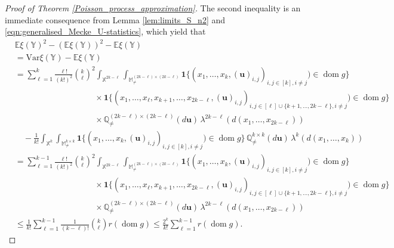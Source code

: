 \documentclass{article}
\theoremstyle{definition}
\numberwithin{equation}{section}
\theoremstyle{remark}
\newcommand{\E}{\mathbb{E}}
\newcommand{\Var}{\mathrm{Var}}
\begin{document}
\begin{proof}[Proof of Theorem \ref{Poisson_process_approximation}]
The second inequality is an immediate consequence from Lemma \ref{lem:limits_S_n2} and \eqref{eqn:generalised_Mecke_U-statistics}, which yield that
\begin{align*}
& \E\xi(\mathbb{Y})^2 - (\E\xi(\mathbb{Y}))^2 - \E\xi(\mathbb{Y})  \\
& = \Var\xi(\mathbb{Y}) - \E\xi(\mathbb{Y})  \\
& = \sum_{\ell=1}^k \frac{\ell!}{(k!)^2} \binom{k}{\ell}^2 \int_{\mathbb{X}^{2k-\ell}} \int_{\mathbb{M}_{\neq}^{(2k-\ell)\times(2k-\ell)}} \mathbf{1}\{(x_1,\ldots,x_k,(\mathbf{u})_{i,j})_{i,j\in[k],i\neq j})\in\operatorname{dom} g\}  \\
& \hspace{4cm} \times \mathbf{1}\{(x_1,\ldots,x_\ell,x_{k+1},\ldots,x_{2k-\ell},(\mathbf{u})_{i,j})_{i,j\in[\ell]\cup\{k+1,\ldots,2k-\ell\}, i\neq j})\in\operatorname{dom} g\} \\
& \hspace{4cm} \times \mathbb{Q}_{\neq}^{(2k-\ell)\times (2k-\ell)}(d\mathbf{u}) \, \lambda^{2k-\ell}(d(x_1,\ldots,x_{2k-\ell})) \\
& \quad - \frac{1}{k!} \int_{\mathbb{X}^k} \int_{\mathbb{M}_{\neq}^{k\times k}} \mathbf{1}\{(x_1,\ldots,x_k,(\mathbf{u})_{i,j})_{i,j\in[k],i\neq j})\in\operatorname{dom} g\} \, \mathbb{Q}_{\neq}^{k\times k}(d\mathbf{u}) \, \lambda^{k}(d(x_1,\ldots,x_k)) \\
& = \sum_{\ell=1}^{k-1} \frac{\ell!}{(k!)^2} \binom{k}{\ell}^2 \int_{\mathbb{X}^{2k-\ell}} \int_{\mathbb{M}_{\neq}^{(2k-\ell)\times(2k-\ell)}} \mathbf{1}\{(x_1,\ldots,x_k,(\mathbf{u})_{i,j})_{i,j\in[k],i\neq j})\in\operatorname{dom} g\}  \\
& \hspace{4cm} \times \mathbf{1}\{(x_1,\ldots,x_\ell,x_{k+1},\ldots,x_{2k-\ell},(\mathbf{u})_{i,j})_{i,j\in[\ell]\cup\{k+1,\ldots,2k-\ell\}, i\neq j})\in\operatorname{dom} g\} \\
& \hspace{4cm} \times \mathbb{Q}_{\neq}^{(2k-\ell)\times (2k-\ell)}(d\mathbf{u}) \, \lambda^{2k-\ell}(d(x_1,\ldots,x_{2k-\ell})) \\
& \leq \frac{1}{k!} \sum_{\ell=1}^{k-1} \frac{1}{(k-\ell)!} \binom{k}{\ell} r(\operatorname{dom} g) \leq \frac{2^k}{k!} \sum_{\ell=1}^{k-1} r(\operatorname{dom} g).
\end{align*}


\end{proof}
\end{document}
